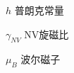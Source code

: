 
\begin{notation}

  \begin{notationlist}{2em}
    \item[$\displaystyle h$] 普朗克常量
    \item[$\displaystyle \gamma_{NV} $] NV旋磁比
    \item[$\displaystyle \mu_{B} $] 波尔磁子
  \end{notationlist}

\end{notation}





